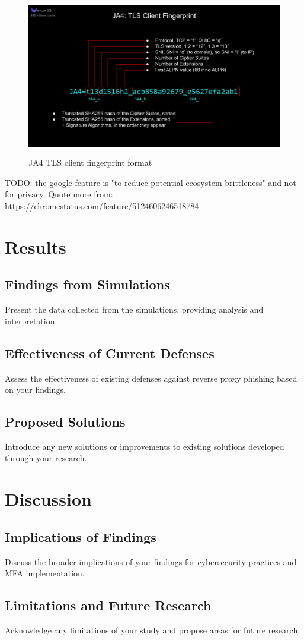 \documentclass[12pt]{report}
\begin{document}
\begin{figure}[!htb]
  \centering
  \includegraphics[height=7cm]{./images/JA4.png}
  \caption{JA4 TLS client fingerprint format}
\end{figure}

TODO: the google feature is "to reduce potential ecosystem brittleness" and not for privacy. Quote more from:
https://chromestatus.com/feature/5124606246518784

\chapter{Results}
\section{Findings from Simulations}
Present the data collected from the simulations, providing analysis and interpretation.

\section{Effectiveness of Current Defenses}
Assess the effectiveness of existing defenses against reverse proxy phishing based
on your findings.

\section{Proposed Solutions}
Introduce any new solutions or improvements to existing solutions developed through
your research.

\chapter{Discussion}
\section{Implications of Findings}
Discuss the broader implications of your findings for cybersecurity practices and
MFA implementation.

\section{Limitations and Future Research}
Acknowledge any limitations of your study and propose areas for future research.

\newpage


\end{document}

